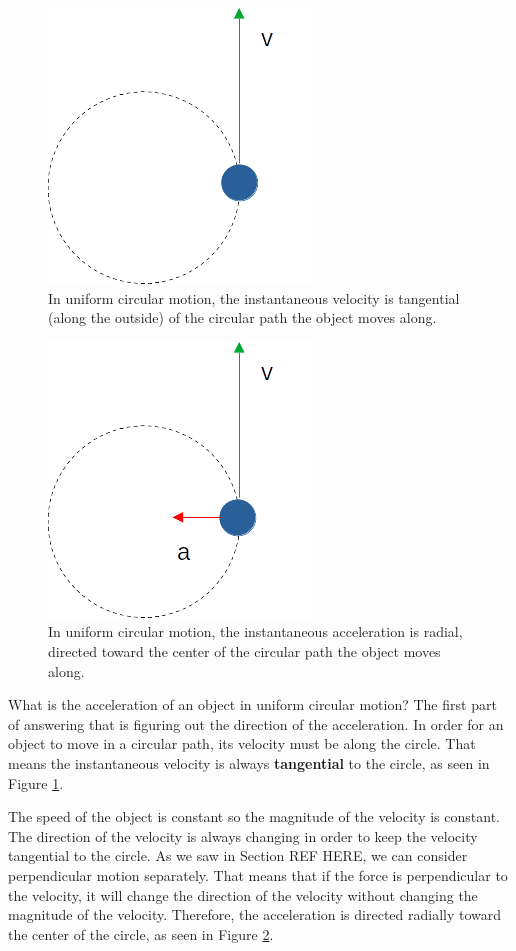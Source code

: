 \documentclass[12pt]{book}
\begin{document}
\begin{figure}[t]
\centering
\includegraphics[scale=0.4]{UCM_vel.png}
\caption{In uniform circular motion, the instantaneous velocity is tangential (along the outside) of the circular path the object moves along.}
\label{ucm_vel}
\end{figure}

\begin{figure}[t]
\centering
\includegraphics[scale=0.4]{UCM_accel.png}
\caption{In uniform circular motion, the instantaneous acceleration is radial, directed toward the center of the circular path the object moves along.}
\label{ucm_accel}
\end{figure}

What is the acceleration of an object in uniform circular motion? The first part of answering that is figuring out the direction of the acceleration. In order for an object to move in a circular path, its velocity must be along the circle. That means the instantaneous velocity is always \textbf{tangential} to the circle, as seen in Figure \ref{ucm_vel}. 

The speed of the object is constant so the magnitude of the velocity is constant. The direction of the velocity is always changing in order to keep the velocity tangential to the circle. As we saw in Section REF HERE, we can consider perpendicular motion separately. That means that if the force is perpendicular to the velocity, it will change the direction of the velocity without changing the magnitude of the velocity. Therefore, the acceleration is directed radially toward the center of the circle, as seen in Figure \ref{ucm_accel}. 
\end{document}
